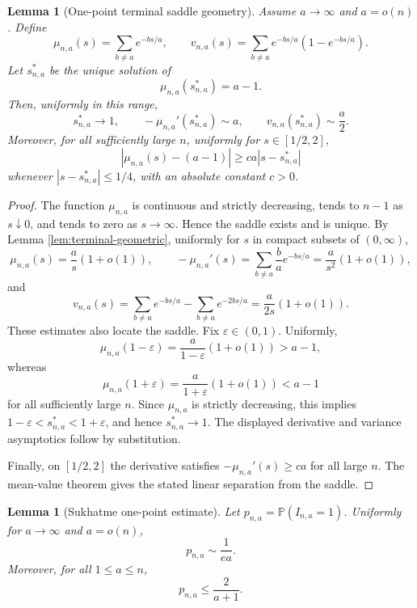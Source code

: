\documentclass[11pt]{article}
\newtheorem{lemma}[theorem]{Lemma}
\theoremstyle{remark}
\newcommand{\Pp}{\mathbb P}
\begin{document}
\begin{lemma}[One-point terminal saddle geometry]\label{lem:suk-one-saddle}
Assume \(a\to\infty\) and \(a=o(n)\).  Define
\[
        \mu_{n,a}(s)=\sum_{b\ne a}e^{-bs/a},
        \qquad
        v_{n,a}(s)=\sum_{b\ne a}e^{-bs/a}(1-e^{-bs/a}).
\]
Let \(s_{n,a}^*\) be the unique solution of
\[
        \mu_{n,a}(s_{n,a}^*)=a-1.
\]
Then, uniformly in this range,
\[
        s_{n,a}^*\to1,
        \qquad
        -\mu_{n,a}'(s_{n,a}^*)\sim a,
        \qquad
        v_{n,a}(s_{n,a}^*)\sim \frac a2 .
\]
Moreover, for all sufficiently large \(n\), uniformly for \(s\in[1/2,2]\),
\[
        |\mu_{n,a}(s)-(a-1)|\ge c a |s-s_{n,a}^*|
\]
whenever \(|s-s_{n,a}^*|\le 1/4\), with an absolute constant \(c>0\).
\end{lemma}

\begin{proof}
The function \(\mu_{n,a}\) is continuous and strictly decreasing, tends to \(n-1\) as \(s\downarrow0\), and tends to zero as \(s\to\infty\).  Hence the saddle exists and is unique.  By Lemma \ref{lem:terminal-geometric}, uniformly for \(s\) in compact subsets of \((0,\infty)\),
\[
        \mu_{n,a}(s)=\frac{a}{s}(1+o(1)),
        \qquad
        -\mu_{n,a}'(s)=\sum_{b\ne a}\frac{b}{a}e^{-bs/a}=\frac{a}{s^2}(1+o(1)),
\]
and
\[
        v_{n,a}(s)
        =\sum_{b\ne a}e^{-bs/a}-\sum_{b\ne a}e^{-2bs/a}
        =\frac{a}{2s}(1+o(1)).
\]
These estimates also locate the saddle.  Fix \(\varepsilon\in(0,1)\).  Uniformly,
\[
        \mu_{n,a}(1-\varepsilon)
        =\frac{a}{1-\varepsilon}(1+o(1))>a-1,
\]
whereas
\[
        \mu_{n,a}(1+\varepsilon)
        =\frac{a}{1+\varepsilon}(1+o(1))<a-1
\]
for all sufficiently large \(n\).  Since \(\mu_{n,a}\) is strictly decreasing, this implies
\(1-\varepsilon<s_{n,a}^*<1+\varepsilon\), and hence \(s_{n,a}^*\to1\).  The displayed derivative and variance asymptotics follow by substitution.

Finally, on \([1/2,2]\) the derivative satisfies \(-\mu_{n,a}'(s)\ge c a\) for all large \(n\).  The mean-value theorem gives the stated linear separation from the saddle.
\end{proof}

\begin{lemma}[Sukhatme one-point estimate]\label{lem:suk-one}
Let \(p_{n,a}=\Pp(I_{n,a}=1)\).  Uniformly for \(a\to\infty\) and \(a=o(n)\),
\[
        p_{n,a}\sim \frac1{ea}.
\]
Moreover, for all \(1\le a\le n\),
\[
        p_{n,a}\le \frac{2}{a+1}.
\]
\end{lemma}
\end{document}
